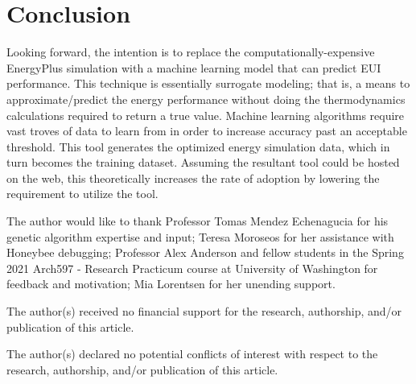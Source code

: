 \documentclass[sagev,times,Royal]{sagej}
\begin{document}
\section{Conclusion}
Looking forward, the intention is to replace the computationally-expensive EnergyPlus simulation with a machine learning model that can predict EUI performance. This technique is essentially  surrogate modeling; that is, a means to approximate/predict the energy performance without doing the thermodynamics calculations required to return a true value. Machine learning algorithms require vast troves of data to learn from in order to increase accuracy past an acceptable threshold. This tool generates the optimized energy simulation data, which in turn becomes the training dataset. Assuming the resultant tool could be hosted on the web, this theoretically increases the rate of adoption by lowering the requirement to utilize the tool. 

\begin{acks}
The author would like to thank Professor Tomas Mendez Echenagucia for his genetic algorithm expertise and input; Teresa Moroseos for her assistance with Honeybee debugging; Professor Alex Anderson and fellow students in the Spring 2021 Arch597 - Research Practicum course at University of Washington for feedback and motivation; Mia Lorentsen for her unending support.
\end{acks}

\begin{funding}
The author(s) received no financial support for the research, authorship, and/or publication of this article.
\end{funding}

\begin{dci}
	The author(s) declared no potential conflicts of interest with respect to the research, authorship, and/or publication of this article.
\end{dci}



\end{document}

